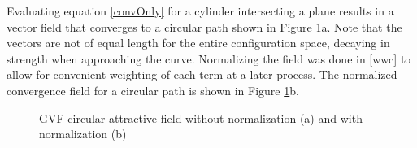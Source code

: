 \documentclass[numbered,pdftex]{ohio-etd}
\begin{document}
Evaluating equation \ref{convOnly} for a cylinder intersecting a plane results in a vector field that converges to a circular path shown in Figure \ref{fig:gvfCircAttractive}a. Note that the vectors are not of equal length for the entire configuration space, decaying in strength when approaching the curve. Normalizing the field was done in [wwc] \cite{goncalves_circulation_2010,goncalves_vector_2010} to allow for convenient weighting of each term at a later process. The normalized convergence field for a circular path is shown in Figure \ref{fig:gvfCircAttractive}b. 

\begin{figure}[H]
	\begin{subfigmatrix}{2}%
		\centering	
		\hspace*{0mm}
	\end{subfigmatrix}
	\caption{GVF circular attractive field without normalization (a) and with normalization (b)}
	\label{fig:gvfCircAttractive}
\end{figure}
\end{document}
